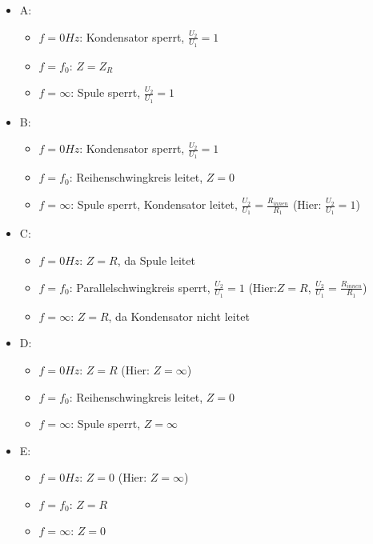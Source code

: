 \documentclass[a4paper]{article}
\begin{document}
\begin{itemize}
    \item{A: 
        \begin{itemize}
            \item $f=0\si{Hz}$: Kondensator sperrt, $\frac{U_2}{U_1} = 1$
            \item $f=f_0$: $Z=Z_R$
            \item $f=\infty$: Spule sperrt, $\frac{U_2}{U_1} = 1$
        \end{itemize}
    }
    
    \item{B: 
        \begin{itemize}
            \item $f=0\si{Hz}$: Kondensator sperrt, $\frac{U_2}{U_1} = 1$
            \item $f=f_0$: Reihenschwingkreis leitet, $Z=0$
            \item $f=\infty$: Spule sperrt, Kondensator leitet, $\frac{U_2}{U_1} = \frac{R_{innen}}{R_1}$ (Hier: $\frac{U_2}{U_1} = 1$)
        \end{itemize}
    }
    
    \item{C: 
        \begin{itemize}
            \item $f=0\si{Hz}$: $Z=R$, da Spule leitet
            \item $f=f_0$: Parallelschwingkreis sperrt, $\frac{U_2}{U_1} = 1$ (Hier:$Z=R$, $\frac{U_2}{U_1} = \frac{R_{innen}}{R_1}$)
            \item $f=\infty$:  $Z=R$, da Kondensator nicht leitet
        \end{itemize}
    }
    
    \item{D: 
        \begin{itemize}
            \item $f=0\si{Hz}$: $Z=R$ (Hier: $Z=\infty$)
            \item $f=f_0$: Reihenschwingkreis leitet, $Z=0$
            \item $f=\infty$: Spule sperrt, $Z=\infty$
        \end{itemize}
    }
    
    \item{E: 
        \begin{itemize}
            \item $f=0\si{Hz}$: $Z=0$ (Hier: $Z=\infty$)
            \item $f=f_0$: $Z=R$
            \item $f=\infty$: $Z=0$
        \end{itemize}
    }
    
\end{itemize}
\end{document}
